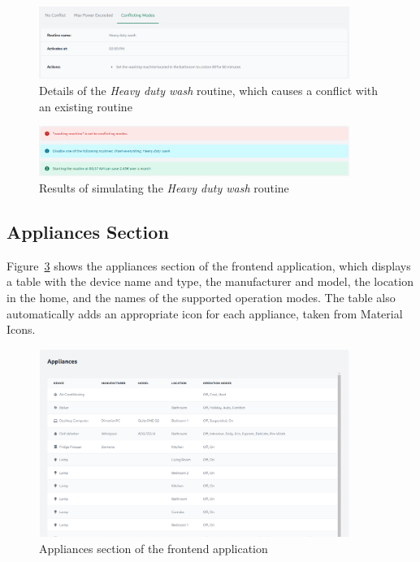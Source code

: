 \begin{figure}
    \centering
    \includegraphics[width=0.9\textwidth]{images/frontend/conflicting_modes.png}
    \caption{Details of the \textit{Heavy duty wash} routine, which causes a conflict with an existing routine}%
    \label{fig:frontend_conflicting_modes}
\end{figure}

\begin{figure}
    \centering
    \includegraphics[width=0.9\textwidth]{images/frontend/conflicting_modes_result.png}
    \caption{Results of simulating the \textit{Heavy duty wash} routine}%
    \label{fig:frontend_conflicting_modes_result}
\end{figure}

\subsection{Appliances Section}

Figure~\ref{fig:frontend_appliances} shows the appliances section of the frontend application, which displays a table with the device name and type, the manufacturer and model, the location in the home, and the names of the supported operation modes. The table also automatically adds an appropriate icon for each appliance, taken from Material Icons.

\begin{figure}
    \centering
    \includegraphics[width=0.9\textwidth]{images/frontend/appliances.png}
    \caption{Appliances section of the frontend application}%
    \label{fig:frontend_appliances}
\end{figure}

